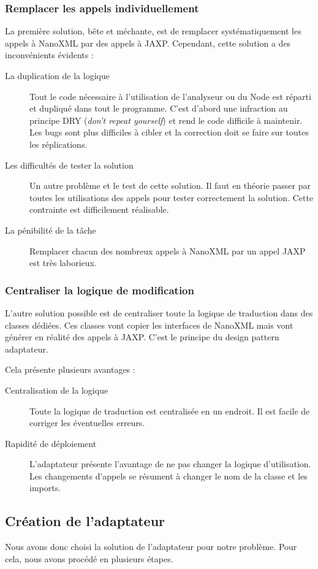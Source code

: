 \subsubsection{Remplacer les appels individuellement}
La première solution, bête et méchante, est de remplacer systématiquement les appels à NanoXML par des appels à JAXP.
Cependant, cette solution a des inconvénients évidents :
\begin{description}
\item[La duplication de la logique] Tout le code nécessaire à l'utilisation de l'analyseur ou du Node est réparti et dupliqué dans tout le programme.
C'est d'abord une infraction au principe DRY (\textit{don't repeat yourself}) et rend le code difficile à maintenir.
Les bugs sont plus difficiles à cibler et la correction doit se faire sur toutes les réplications.
\item[Les difficultés de tester la solution] Un autre problème et le test de cette solution.
Il faut en théorie passer par toutes les utilisations des appels pour tester correctement la solution. Cette contrainte est difficilement réalisable.
\item[La pénibilité de la tâche] Remplacer chacun des nombreux appels à NanoXML par un appel JAXP est très laborieux.
\end{description}
\subsubsection{Centraliser la logique de modification}
L'autre solution possible est de centraliser toute la logique de traduction dans des classes dédiées.
Ces classes vont copier les interfaces de NanoXML mais vont générer en réalité des appels à JAXP.
C'est le principe du design pattern adaptateur.

Cela présente plusieurs avantages :
\begin{description}
\item[Centralisation de la logique] Toute la logique de traduction est centralisée en un endroit. Il est facile de corriger les éventuelles erreurs.
\item[Rapidité de déploiement] L'adaptateur présente l'avantage de ne pas changer la logique d'utilisation. Les changements d'appels se résument à changer le nom de la classe et les imports.
\end{description}

\subsection{Création de l'adaptateur}
Nous avons donc choisi la solution de l'adaptateur pour notre problème. Pour cela, nous avons procédé en plusieurs étapes.

